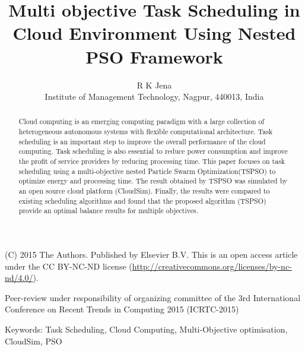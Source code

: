 \documentclass[10pt]{article}
\title{\textbf{Multi objective Task Scheduling in Cloud Environment Using Nested PSO Framework} }
\author{R K Jena\\
Institute of Management Technology, Nagpur, 440013, India}
\date{}
\begin{document}
\maketitle

\hline

\begin{abstract}

    
Cloud computing is an emerging computing paradigm with a large collection of heterogeneous autonomous systems with flexible computational architecture. Task scheduling is an important step to improve the overall performance of the cloud computing. Task scheduling is also essential to reduce power consumption and improve the profit of service providers by reducing processing time. This paper focuses on task scheduling using a multi-objective nested Particle Swarm Optimization(TSPSO) to optimize energy and processing time. The result obtained by TSPSO was simulated by an open source cloud platform (CloudSim). Finally, the results were compared to existing scheduling algorithms and found that the proposed algorithm (TSPSO) provide an optimal balance results for multiple objectives.
\end{abstract}

(C) 2015 The Authors. Published by Elsevier B.V. This is an open access article under the CC BY-NC-ND license (\href{http://creativecommons.org/licenses/by-nc-nd/4.0/}{http://creativecommons.org/licenses/by-nc-nd/4.0/}).

Peer-review under responsibility of organizing committee of the 3rd International Conference on Recent Trends in Computing 2015 (ICRTC-2015)

Keywords: Task Scheduling, Cloud Computing, Multi-Objective optimisation, CloudSim, PSO
\vspace{3mm}

\hline
\end{document}
